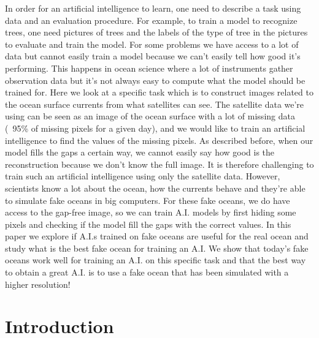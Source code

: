 \begin{bibunit}[IEEEtran.bst]
In order for an artificial intelligence to learn, one need to describe a task using data and an evaluation procedure. For example, to train a model to recognize trees, one need pictures of trees and the labels of the type of tree in the pictures to evaluate and train the model.
For some problems we have access to a lot of data but cannot easily train a model because we can't easily tell how good it's performing. This happens in ocean science where a lot of instruments gather observation data but it's not always easy to compute what the model should be trained for.
Here we look at a specific task which is to construct images related to the ocean surface currents from what satellites can see. The satellite data we're using can be seen as an image of the ocean surface with a lot of missing data (~95\% of missing pixels for a given day), and we would like to train an artificial intelligence to find the values of the missing pixels.
As described before, when our model fills the gaps a certain way, we cannot easily say how good is the reconstruction because we don't know the full image. It is therefore challenging to train such an artificial intelligence using only the satellite data.
However, scientists know a lot about the ocean, how the currents behave and they're able to simulate fake oceans in big computers. For these fake oceans, we do have access to the gap-free image, so we can train A.I. models by first hiding some pixels and checking if the model fill the gaps with the correct values.
In this paper we explore if A.I.s trained on fake oceans are useful for the real ocean and study what is the best fake ocean for training an A.I.
We show that today's fake oceans work well for training an A.I. on this specific task and that the best way to obtain a great A.I. is to use a fake ocean that has been simulated with a higher resolution!


\section{Introduction}







\end{bibunit}
